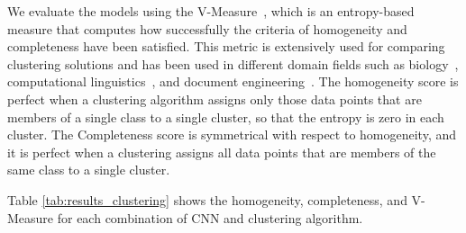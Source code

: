 We evaluate the models using the V-Measure~\cite{vmeasure}, which is an entropy-based measure that computes how successfully the criteria of homogeneity and completeness have been satisfied. This metric is extensively used for comparing clustering solutions and has been used in different domain fields such as biology~\cite{bio1}, computational linguistics~\cite{nlp1}, and document engineering~\cite{doceng}.
The homogeneity score is perfect when a clustering algorithm assigns only those data points that are members of a single class to a single cluster, so that the entropy is zero in each cluster. The Completeness score is symmetrical with respect to homogeneity, and it is perfect when a clustering assigns all data points that are members of the same class to a single cluster.

Table \ref{tab:results_clustering} shows the homogeneity, completeness, and V-Measure for each combination of CNN and clustering algorithm.

